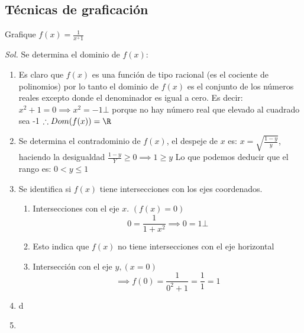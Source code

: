 \subsection{Técnicas de graficación}

\begin{example}
	Grafique $f(x)=\frac{1}{x^+1}$

	\textit{ Sol. }
	Se determina el dominio de $f(x)$:
	\begin{enumerate}
		\item Es claro que $f(x)$ es una función de tipo racional
		      (es el cociente de polinomios) por lo tanto el dominio de $f(x)$ es el conjunto de los números reales excepto donde el denominador es igual a cero.
		      Es decir:
		      $x^2+1=0\implies x^2=-1 \bot$ porque no hay número real que elevado al cuadrado sea -1
		      $\therefore Dom(f(x))=\R$
		\item Se determina el contradominio de $f(x)$, el despeje de $x$ es:
		      $x=\sqrt{\frac{1-y}{y}}$, haciendo la desigualdad $\frac{1-y}{Y}\geq 0 \implies 1\geq y$
		      Lo que podemos deducir que el rango es: $0<y\leq 1$
		\item Se identifica si $f(x)$ tiene intersecciones con los ejes coordenados.
		      \begin{enumerate}
			      \item Intersecciones con el eje $x$. $(f(x)=0)$
			            \begin{equation*}
				            0=\frac{1}{1+x^2}\implies 0=1 \bot
			            \end{equation*}
			      \item Esto indica que $f(x)$ no tiene intersecciones con el eje horizontal
			      \item Intersección con el eje $y, \left(x=0\right)$
			            \begin{equation*}
				            \implies f(0)=\frac{1}{0^2+1}=\frac{1}{1}=1
			            \end{equation*}
		      \end{enumerate}
		\item d
		\item
	\end{enumerate}
\end{example}


